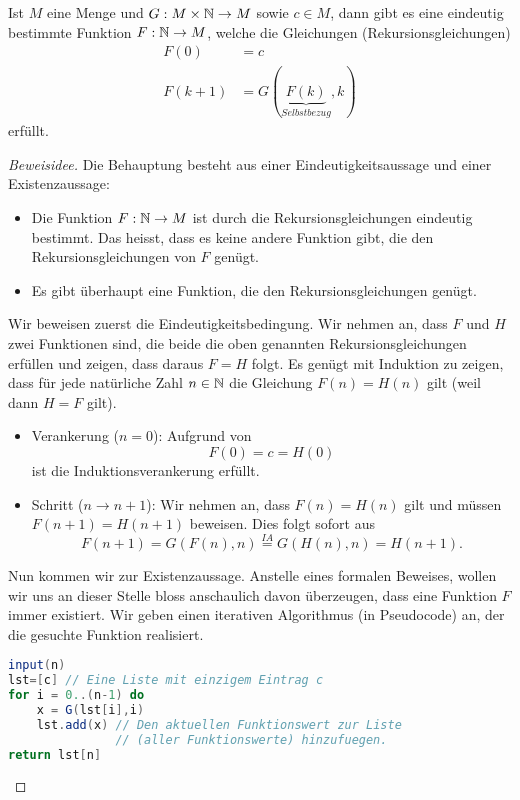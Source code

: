 \begin{thrm}\label{thrm:rekursive definitionen}
 Ist $M$ eine Menge und $G:M\times\mathbb{N}\rightarrow M$ sowie $c\in M$, dann gibt es eine eindeutig bestimmte Funktion $F:\mathbb{N}\rightarrow M$, welche die Gleichungen (Rekursionsgleichungen)
\begin{align*}
 F(0)&=c\\
F(k+1)&=G(\underbrace{F(k)}_{Selbstbezug},k)
\end{align*}
erfüllt.
\end{thrm}
\begin{proof}[Beweisidee]
Die Behauptung besteht aus einer Eindeutigkeitsaussage und einer Existenzaussage:
\begin{itemize}
\item Die Funktion $F:\mathbb{N}\to M$ ist durch die Rekursionsgleichungen eindeutig bestimmt. Das heisst, dass es keine andere  Funktion gibt, die den Rekursionsgleichungen von $F$ genügt.
\item Es gibt überhaupt eine Funktion, die den Rekursionsgleichungen genügt.
\end{itemize}
Wir beweisen zuerst die Eindeutigkeitsbedingung. Wir nehmen an, dass $F$ und $H$ zwei Funktionen sind, die beide die oben genannten Rekursionsgleichungen erfüllen und zeigen, dass daraus $F=H$ folgt. Es genügt mit Induktion zu zeigen, dass für jede natürliche Zahl $n\in \mathbb{N}$ die Gleichung $F(n)=H(n)$ gilt (weil dann $H=F$ gilt).
\begin{itemize}
\item Verankerung ($n=0$): Aufgrund von
\[
F(0)=c=H(0)
\]
ist die Induktionsverankerung erfüllt.
\item Schritt ($n\to n+1$): Wir nehmen an, dass $F(n)=H(n)$ gilt und müssen $F(n+1)=H(n+1)$ beweisen. Dies folgt sofort aus
\[
F(n+1)=G(F(n),n)\stackrel{IA}{=}G(H(n),n)=H(n+1).
\]
\end{itemize}
Nun kommen wir zur Existenzaussage. Anstelle eines formalen Beweises, wollen wir uns an dieser Stelle bloss anschaulich davon überzeugen, dass eine Funktion $F$ immer existiert. Wir geben einen iterativen Algorithmus (in Pseudocode) an, der die gesuchte Funktion realisiert.
\begin{framed}
\begin{lstlisting}[language=Java]
input(n)
lst=[c] // Eine Liste mit einzigem Eintrag c
for i = 0..(n-1) do
    x = G(lst[i],i)
    lst.add(x) // Den aktuellen Funktionswert zur Liste
               // (aller Funktionswerte) hinzufuegen.
return lst[n]
\end{lstlisting}
\end{framed}\qedhere
\end{proof}
